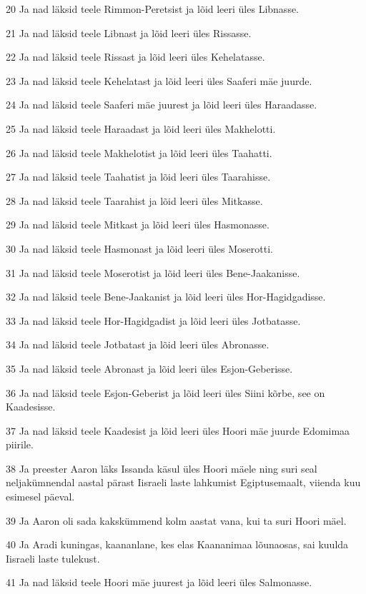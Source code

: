 \par 20 Ja nad läksid teele Rimmon-Peretsist ja lõid leeri üles Libnasse.
\par 21 Ja nad läksid teele Libnast ja lõid leeri üles Rissasse.
\par 22 Ja nad läksid teele Rissast ja lõid leeri üles Kehelatasse.
\par 23 Ja nad läksid teele Kehelatast ja lõid leeri üles Saaferi mäe juurde.
\par 24 Ja nad läksid teele Saaferi mäe juurest ja lõid leeri üles Haraadasse.
\par 25 Ja nad läksid teele Haraadast ja lõid leeri üles Makhelotti.
\par 26 Ja nad läksid teele Makhelotist ja lõid leeri üles Taahatti.
\par 27 Ja nad läksid teele Taahatist ja lõid leeri üles Taarahisse.
\par 28 Ja nad läksid teele Taarahist ja lõid leeri üles Mitkasse.
\par 29 Ja nad läksid teele Mitkast ja lõid leeri üles Hasmonasse.
\par 30 Ja nad läksid teele Hasmonast ja lõid leeri üles Moserotti.
\par 31 Ja nad läksid teele Moserotist ja lõid leeri üles Bene-Jaakanisse.
\par 32 Ja nad läksid teele Bene-Jaakanist ja lõid leeri üles Hor-Hagidgadisse.
\par 33 Ja nad läksid teele Hor-Hagidgadist ja lõid leeri üles Jotbatasse.
\par 34 Ja nad läksid teele Jotbatast ja lõid leeri üles Abronasse.
\par 35 Ja nad läksid teele Abronast ja lõid leeri üles Esjon-Geberisse.
\par 36 Ja nad läksid teele Esjon-Geberist ja lõid leeri üles Siini kõrbe, see on Kaadesisse.
\par 37 Ja nad läksid teele Kaadesist ja lõid leeri üles Hoori mäe juurde Edomimaa piirile.
\par 38 Ja preester Aaron läks Issanda käsul üles Hoori mäele ning suri seal neljakümnendal aastal pärast Iisraeli laste lahkumist Egiptusemaalt, viienda kuu esimesel päeval.
\par 39 Ja Aaron oli sada kakskümmend kolm aastat vana, kui ta suri Hoori mäel.
\par 40 Ja Aradi kuningas, kaananlane, kes elas Kaananimaa lõunaosas, sai kuulda Iisraeli laste tulekust.
\par 41 Ja nad läksid teele Hoori mäe juurest ja lõid leeri üles Salmonasse.
